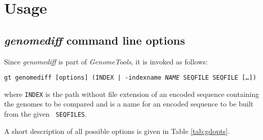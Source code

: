 \documentclass[12pt,titlepage]{article}
\newcommand{\Gdiff}{\textit{genomediff}\xspace}
\newcommand{\GenomeTools}{\textit{GenomeTools}\xspace}
\newcommand{\File}[1]{\texttt{\small #1}}
\begin{document}
\section{Usage}
\subsection{\Gdiff command line options}
Since \Gdiff is part of \GenomeTools, it is invoked as follows:

\texttt{gt genomediff [{\footnotesize options}] ({\small INDEX} |
{\footnotesize -indexname} \textit{\footnotesize NAME} {\small SEQFILE SEQFILE
[\ldots])}}

where \File{INDEX} is the path without file extension of an encoded
sequence containing the genomes to be compared and  is a
name for an encoded sequence to be built from the given \texttt{\small
SEQFILES}.

A short description of all possible options is given in Table \ref{tab:gdopts}.
\end{document}
